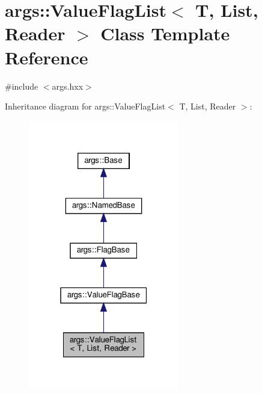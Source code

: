 \hypertarget{classargs_1_1_value_flag_list}{}\section{args\+:\+:Value\+Flag\+List$<$ T, List, Reader $>$ Class Template Reference}
\label{classargs_1_1_value_flag_list}


{\ttfamily \#include $<$args.\+hxx$>$}



Inheritance diagram for args\+:\+:Value\+Flag\+List$<$ T, List, Reader $>$\+:\nopagebreak
\begin{figure}[H]
\begin{center}
\leavevmode
\includegraphics[width=187pt]{classargs_1_1_value_flag_list__inherit__graph}
\end{center}
\end{figure}


